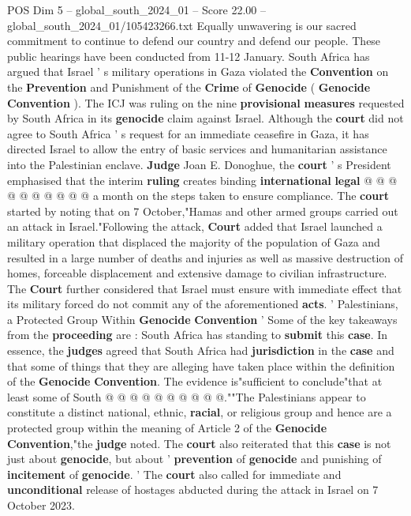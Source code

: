 \begin{textsample}{POS Dim 5 – global\_south\_2024\_01 – Score 22.00 – global\_south\_2024\_01/105423266.txt}
Equally unwavering is our sacred commitment to continue to defend our country and defend our people.
These public hearings have been conducted from 11-12 January.
South Africa has argued that Israel ' s military operations in Gaza violated the \textbf{Convention} on the \textbf{Prevention} and Punishment of the \textbf{Crime} of \textbf{Genocide} ( \textbf{Genocide} \textbf{Convention} ).
The ICJ was ruling on the nine \textbf{provisional} \textbf{measures} requested by South Africa in its \textbf{genocide} claim against Israel.
Although the \textbf{court} did not agree to South Africa ' s request for an immediate ceasefire in Gaza, it has directed Israel to allow the entry of basic services and humanitarian assistance into the Palestinian enclave. \textbf{Judge} Joan E.
Donoghue, the \textbf{court} ' s President emphasised that the interim \textbf{ruling} creates binding \textbf{international} \textbf{legal} @ @ @ @ @ @ @ @ @ @ a month on the steps taken to ensure compliance.
The \textbf{court} started by noting that on 7 October,"Hamas and other armed groups carried out an attack in Israel."Following the attack, \textbf{Court} added that Israel launched a military operation that displaced the majority of the population of Gaza and resulted in a large number of deaths and injuries as well as massive destruction of homes, forceable displacement and extensive damage to civilian infrastructure.
The \textbf{Court} further considered that Israel must ensure with immediate effect that its military forced do not commit any of the aforementioned \textbf{acts}. ' Palestinians, a Protected Group Within \textbf{Genocide} \textbf{Convention} ' Some of the key takeaways from the \textbf{proceeding} are : South Africa has standing to \textbf{submit} this \textbf{case}.
In essence, the \textbf{judges} agreed that South Africa had \textbf{jurisdiction} in the \textbf{case} and that some of things that they are alleging have taken place within the definition of the \textbf{Genocide} \textbf{Convention}.
The evidence is"sufficient to conclude"that at least some of South @ @ @ @ @ @ @ @ @ @.""The Palestinians appear to constitute a distinct national, ethnic, \textbf{racial}, or religious group and hence are a protected group within the meaning of Article 2 of the \textbf{Genocide} \textbf{Convention},"the \textbf{judge} noted.
The \textbf{court} also reiterated that this \textbf{case} is not just about \textbf{genocide}, but about ' \textbf{prevention} of \textbf{genocide} and punishing of \textbf{incitement} of \textbf{genocide}. ' The \textbf{court} also called for immediate and \textbf{unconditional} release of hostages abducted during the attack in Israel on 7 October 2023.

\end{textsample}
